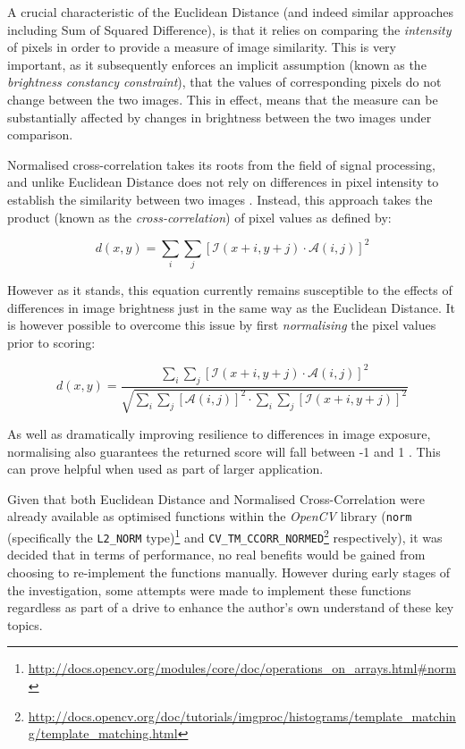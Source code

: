 A crucial characteristic of the Euclidean Distance (and indeed similar approaches including Sum of Squared Difference), is that it relies on comparing the \textit{intensity} of pixels in order to provide a measure of image similarity. This is very important, as it subsequently enforces an implicit assumption (known as the \textit{brightness constancy constraint}), that the values of corresponding pixels do not change between the two images\cite{szeliski}. This in effect, means that the measure can be substantially affected by changes in brightness between the two images under comparison.  

Normalised cross-correlation takes its roots from the field of signal processing, and unlike Euclidean Distance does not rely on differences in pixel intensity to establish the similarity between two images \cite{szeliski}. Instead, this approach takes the product (known as the \textit{cross-correlation}) of pixel values as defined by:

\begin{equation}
d(x, y) = \sum\limits_{i}\sum\limits_{j}[\mathcal{I}(x + i, y + j) \cdot \mathcal{A}(i, j)]^2
\end{equation}

However as it stands, this equation currently remains susceptible to the effects of differences in image brightness just in the same way as the Euclidean Distance. It is however possible to overcome this issue by first \textit{normalising} the pixel values prior to scoring: 

\begin{equation}
d(x, y) = \frac{\sum\limits_{i}\sum\limits_{j}[\mathcal{I}(x + i, y + j) \cdot \mathcal{A}(i, j)]^2}{\sqrt{\sum\limits_{i}\sum\limits_{j}[\mathcal{A}(i, j)]^2 \cdot \sum\limits_{i}\sum\limits_{j}[\mathcal{I}(x + i, y + j)]^2}}
\end{equation}

As well as dramatically improving resilience to differences in image exposure, normalising also guarantees the returned score will fall between -1 and 1 \cite{szeliski}. This can prove helpful when used as part of larger application. 

Given that both Euclidean Distance and Normalised Cross-Correlation were already available as optimised functions within the \textit{OpenCV} library (\texttt{norm} (specifically the \texttt{L2\_NORM} type)\footnote{\url{http://docs.opencv.org/modules/core/doc/operations_on_arrays.html#norm}} and \texttt{CV\_TM\_CCORR\_NORMED}\footnote{\url{http://docs.opencv.org/doc/tutorials/imgproc/histograms/template_matching/template_matching.html}} respectively), it was decided that in terms of performance, no real benefits would be gained from choosing to re-implement the functions manually. However during early stages of the investigation, some attempts were made to implement these functions regardless as part of a drive to enhance the author's own understand of these key topics.

